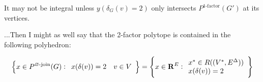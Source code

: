 \documentclass{article}
\begin{document}
	It may not be integral unless $y(\delta_G(v)=2)$ only
	intersects $P^{\text{1-factor}}(G')$ at its vertices.

	...Then I might as well say that the 2-factor polytope is contained
	in the following polyhedron:

	$$\cbr{x\in P^{\text{$\varnothing$-join}}(G) : \begin{array}{ll}
		x(\delta(v)) = 2 & v\in V
	\end{array}} = \cbr{x \in \mathbf{R}^E: \begin{array}{ll}
		x^* \in R((V^*, E^\Delta)) \\
		x(\delta(v)) = 2
	\end{array}}$$
\end{document}
